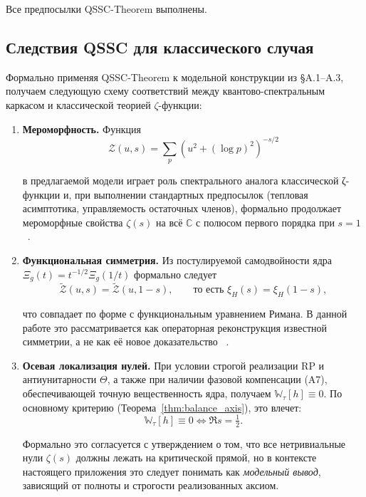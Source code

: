 \documentclass{article}
\numberwithin{equation}{section}
\theoremstyle{plain}
\theoremstyle{definition}
\theoremstyle{remark}
\begin{document}
Все предпосылки QSSC-Theorem выполнены.

\subsection*{Следствия QSSC для классического случая}

Формально применяя QSSC-Theorem к модельной конструкции из §A.1–A.3,
получаем следующую схему соответствий между квантово-спектральным
каркасом и классической теорией $\zeta$-функции:

\begin{enumerate}[label=(\alph*),leftmargin=2.2em]
  \item \textbf{Мероморфность.}
  Функция
\begin{equation}
  \mathcal Z(u,s)
  =\sum_p (u^2+(\log p)^2)^{-s/2}
\label{eq:QSSC0039}
\end{equation}

  в предлагаемой модели играет роль спектрального аналога классической
  ζ-функции и, при выполнении стандартных предпосылок (тепловая асимптотика,
  управляемость остаточных членов), формально продолжает мероморфные свойства
  $\zeta(s)$ на всё $\mathbb C$ с полюсом первого порядка при $s=1$ ~\cite{Voros1987}.

  \item \textbf{Функциональная симметрия.}
  Из постулируемой самодвойности ядра
  $\Xi_g(t)=t^{-1/2}\Xi_g(1/t)$ формально следует
\begin{equation}
  \widetilde{\mathcal Z}(u,s)=\widetilde{\mathcal Z}(u,1-s),
  \qquad
  \text{то есть } \xi_H(s)=\xi_H(1-s),
\label{eq:QSSC0040}
\end{equation}

  что совпадает по форме с функциональным уравнением Римана.
  В данной работе это рассматривается как операторная реконструкция
  известной симметрии, а не как её новое доказательство ~\cite{Hecke1944}.

\item \textbf{Осевая локализация нулей.}
  При условии строгой реализации RP и антиунитарности $\Theta$, а также при наличии фазовой компенсации (A7), обеспечивающей точную вещественность ядра, получаем $\mathbb W_\tau[h]\equiv0$. По основному критерию (Теорема~\ref{thm:balance_axis}), это влечет:
\begin{equation}
  \mathbb W_\tau[h]\equiv0
  \Longleftrightarrow
  \Re s=\tfrac12.
\label{eq:QSSC0041}
\end{equation}

  Формально это согласуется с утверждением о том, что все
  нетривиальные нули $\zeta(s)$ должны лежать на критической прямой,
  но в контексте настоящего приложения это следует понимать как
  \emph{модельный вывод}, зависящий от полноты и строгости
  реализованных аксиом.
\end{enumerate}
\end{document}
